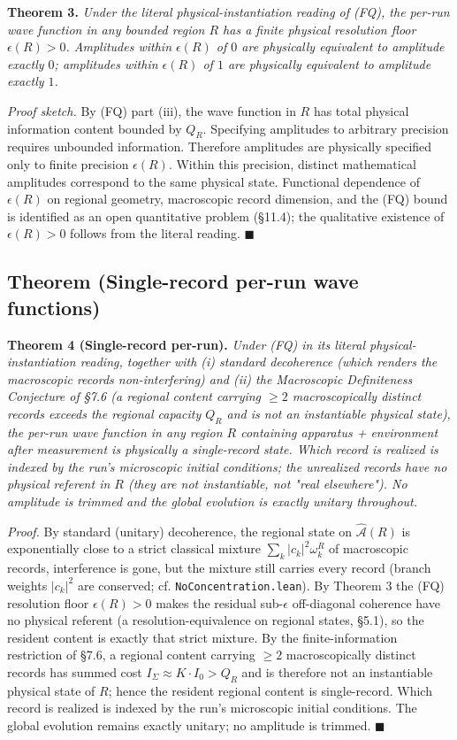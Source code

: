 \documentclass[11pt,a4paper]{article}
\begin{document}
\textbf{Theorem 3.} \emph{Under the literal physical-instantiation reading of (FQ), the per-run wave function in any bounded region $R$ has a finite physical resolution floor $\epsilon(R) > 0$. Amplitudes within $\epsilon(R)$ of $0$ are physically equivalent to amplitude exactly $0$; amplitudes within $\epsilon(R)$ of $1$ are physically equivalent to amplitude exactly $1$.}

\emph{Proof sketch.} By (FQ) part (iii), the wave function in $R$ has total physical information content bounded by $Q_R$. Specifying amplitudes to arbitrary precision requires unbounded information. Therefore amplitudes are physically specified only to finite precision $\epsilon(R)$. Within this precision, distinct mathematical amplitudes correspond to the same physical state. Functional dependence of $\epsilon(R)$ on regional geometry, macroscopic record dimension, and the (FQ) bound is identified as an open quantitative problem (§11.4); the qualitative existence of $\epsilon(R) > 0$ follows from the literal reading. $\blacksquare$

\subsection{Theorem (Single-record per-run wave functions)}

\textbf{Theorem 4 (Single-record per-run).} \emph{Under (FQ) in its literal physical-instantiation reading, together with (i) standard decoherence (which renders the macroscopic records non-interfering) and (ii) the Macroscopic Definiteness Conjecture of §7.6 (a regional content carrying $\ge 2$ macroscopically distinct records exceeds the regional capacity $Q_R$ and is not an instantiable physical state), the per-run wave function in any region $R$ containing apparatus + environment after measurement is physically a single-record state. Which record is realized is indexed by the run's microscopic initial conditions; the unrealized records have no physical referent in $R$ (they are not instantiable, not "real elsewhere"). No amplitude is trimmed and the global evolution is exactly unitary throughout.}

\emph{Proof.} By standard (unitary) decoherence, the regional state on $\hat{\mathcal{A}}(R)$ is exponentially close to a strict classical mixture $\sum_k |c_k|^2 \omega_k^R$ of macroscopic records, interference is gone, but the mixture still carries every record (branch weights $|c_k|^2$ are conserved; cf. \texttt{NoConcentration.lean}). By Theorem 3 the (FQ) resolution floor $\epsilon(R) > 0$ makes the residual sub-$\epsilon$ off-diagonal coherence have no physical referent (a resolution-equivalence on regional states, §5.1), so the resident content is exactly that strict mixture. By the finite-information restriction of §7.6, a regional content carrying $\ge 2$ macroscopically distinct records has summed cost $I_\Sigma \approx K \cdot I_0 > Q_R$ and is therefore not an instantiable physical state of $R$; hence the resident regional content is single-record. Which record is realized is indexed by the run's microscopic initial conditions. The global evolution remains exactly unitary; no amplitude is trimmed. $\blacksquare$
\end{document}
